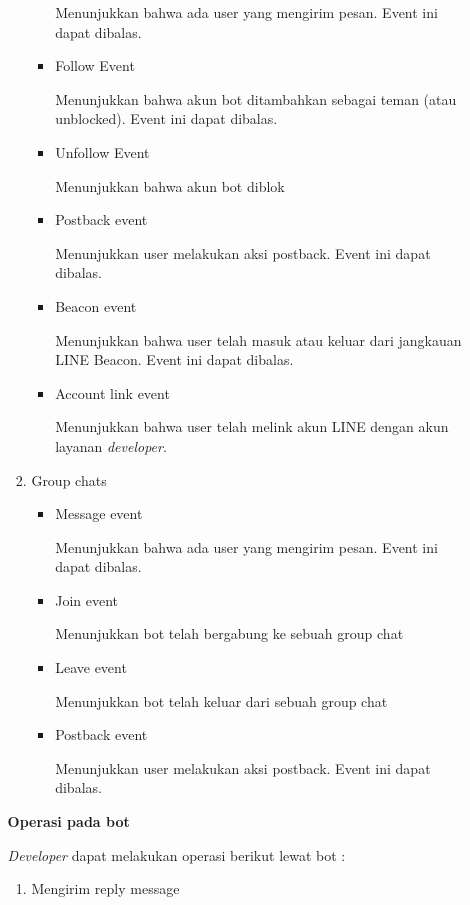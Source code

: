 \documentclass[a4paper,twoside]{article}
\begin{document}
\begin{enumerate}
\begin{enumerate}
\begin{enumerate}
\begin{itemize}
Menunjukkan bahwa ada user yang mengirim pesan. Event ini dapat dibalas.

\item Follow Event

Menunjukkan bahwa akun bot ditambahkan sebagai teman (atau unblocked). Event ini dapat dibalas.

\item Unfollow Event

Menunjukkan bahwa akun bot diblok

\item Postback event

Menunjukkan user melakukan aksi postback. Event ini dapat dibalas.

\item Beacon event

Menunjukkan bahwa user telah masuk atau keluar dari jangkauan LINE Beacon. Event ini dapat dibalas.

\item Account link event 

Menunjukkan bahwa user telah melink akun LINE dengan akun layanan \textit{developer}. 

\end{itemize}

\item Group chats

\begin{itemize}
\item Message event

Menunjukkan bahwa ada user yang mengirim pesan. Event ini dapat dibalas.

\item Join event

Menunjukkan bot telah bergabung ke sebuah group chat

\item Leave event

Menunjukkan bot telah keluar dari sebuah group chat

\item Postback event

Menunjukkan user melakukan aksi postback. Event ini dapat dibalas.

\end{itemize}

\end{enumerate}

\textbf{Operasi pada bot}

\textit{Developer} dapat melakukan operasi berikut lewat bot :
\begin{enumerate}
\item Mengirim reply message


\end{enumerate}
\end{enumerate}
\end{enumerate}
\end{document}
